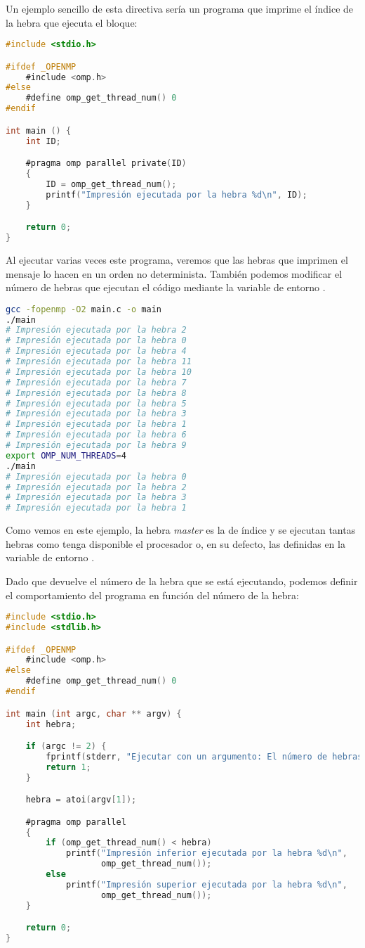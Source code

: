 Un ejemplo sencillo de esta directiva sería un programa que imprime el índice de la hebra que ejecuta el bloque:

\begin{lstlisting}[language=C]
#include <stdio.h>

#ifdef _OPENMP
	#include <omp.h>
#else
	#define omp_get_thread_num() 0
#endif

int main () {
	int ID;

	#pragma omp parallel private(ID)
	{
		ID = omp_get_thread_num();
		printf("Impresión ejecutada por la hebra %d\n", ID);
	}

	return 0;
}
\end{lstlisting}

Al ejecutar varias veces este programa, veremos que las hebras que imprimen el mensaje lo hacen en un orden no determinista.
También podemos modificar el número de hebras que ejecutan el código mediante la variable de entorno .

\pagebreak

\begin{lstlisting}[language=sh]
gcc -fopenmp -O2 main.c -o main
./main
# Impresión ejecutada por la hebra 2
# Impresión ejecutada por la hebra 0
# Impresión ejecutada por la hebra 4
# Impresión ejecutada por la hebra 11
# Impresión ejecutada por la hebra 10
# Impresión ejecutada por la hebra 7
# Impresión ejecutada por la hebra 8
# Impresión ejecutada por la hebra 5
# Impresión ejecutada por la hebra 3
# Impresión ejecutada por la hebra 1
# Impresión ejecutada por la hebra 6
# Impresión ejecutada por la hebra 9
export OMP_NUM_THREADS=4
./main
# Impresión ejecutada por la hebra 0
# Impresión ejecutada por la hebra 2
# Impresión ejecutada por la hebra 3
# Impresión ejecutada por la hebra 1
\end{lstlisting}

Como vemos en este ejemplo, la hebra \textit{master} es la de índice  y se ejecutan tantas hebras como tenga disponible el procesador o, en su defecto, las definidas en la variable de entorno .

Dado que  devuelve el número de la hebra que se está ejecutando, podemos definir el comportamiento del programa en función del número de la hebra:

\begin{lstlisting}[language=C]
#include <stdio.h>
#include <stdlib.h>

#ifdef _OPENMP
	#include <omp.h>
#else
	#define omp_get_thread_num() 0
#endif

int main (int argc, char ** argv) {
	int hebra;

	if (argc != 2) {
		fprintf(stderr, "Ejecutar con un argumento: El número de hebras.\n");
		return 1;
	}

	hebra = atoi(argv[1]);

	#pragma omp parallel
	{
		if (omp_get_thread_num() < hebra)
			printf("Impresión inferior ejecutada por la hebra %d\n",
			       omp_get_thread_num());
		else
			printf("Impresión superior ejecutada por la hebra %d\n",
			       omp_get_thread_num());
	}

	return 0;
}
\end{lstlisting}

